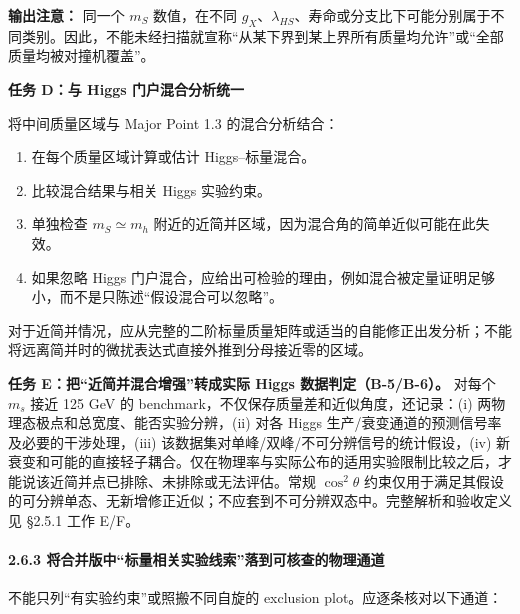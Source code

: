 \documentclass[
]{article}
\providecommand{\tightlist}{%
  \setlength{\itemsep}{0pt}\setlength{\parskip}{0pt}}
\begin{document}
\textbf{输出注意：} 同一个 \(m_S\) 数值，在不同
\(g_X\)、\(\lambda_{HS}\)、寿命或分支比下可能分别属于不同类别。因此，不能未经扫描就宣称``从某下界到某上界所有质量均允许''或``全部质量均被对撞机覆盖''。

\textbf{任务 D：与 Higgs 门户混合分析统一}

将中间质量区域与 Major Point 1.3 的混合分析结合：

\begin{enumerate}
\def\labelenumi{\arabic{enumi}.}
\tightlist
\item
  在每个质量区域计算或估计 Higgs--标量混合。
\item
  比较混合结果与相关 Higgs 实验约束。
\item
  单独检查 \(m_S\simeq m_h\)
  附近的近简并区域，因为混合角的简单近似可能在此失效。
\item
  如果忽略 Higgs
  门户混合，应给出可检验的理由，例如混合被定量证明足够小，而不是只陈述``假设混合可以忽略''。
\end{enumerate}

对于近简并情况，应从完整的二阶标量质量矩阵或适当的自能修正出发分析；不能将远离简并时的微扰表达式直接外推到分母接近零的区域。

\textbf{任务 E：把``近简并混合增强''转成实际 Higgs
数据判定（B-5/B-6）。} 对每个 \(m_s\) 接近 125 GeV 的
benchmark，不仅保存质量差和近似角度，还记录：(i)
两物理态极点和总宽度、能否实验分辨，(ii) 对各 Higgs
生产/衰变通道的预测信号率及必要的干涉处理，(iii)
该数据集对单峰/双峰/不可分辨信号的统计假设，(iv)
新衰变和可能的直接轻子耦合。仅在物理率与实际公布的适用实验限制比较之后，才能说该近简并点已排除、未排除或无法评估。常规
\(\cos^2\theta\)
约束仅用于满足其假设的可分辨单态、无新增修正近似；不应套到不可分辨双态中。完整解析和验收定义见
§2.5.1 工作 E/F。

\paragraph{2.6.3
将合并版中``标量相关实验线索''落到可核查的物理通道}\label{ux5c06ux5408ux5e76ux7248ux4e2dux6807ux91cfux76f8ux5173ux5b9eux9a8cux7ebfux7d22ux843dux5230ux53efux6838ux67e5ux7684ux7269ux7406ux901aux9053}

不能只列``有实验约束''或照搬不同自旋的 exclusion
plot。应逐条核对以下通道：
\end{document}
